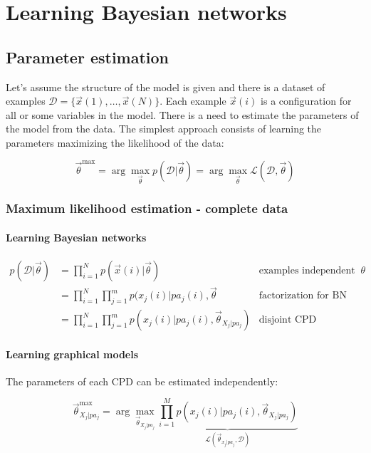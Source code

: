 \chapter{Learning Bayesian networks}

\section{Parameter estimation}
Let's assume the structure of the model is given and there is a dataset of examples $\mathcal{D} =\{\vec{x}(1), \dots, \vec{x}(N)\}$.
Each example $\vec{x}(i)$ is a configuration for all or some variables in the model.
There is a need to estimate the parameters of the model from the data.
The simplest approach consists of learning the parameters maximizing the likelihood of the data:

$$\vec{\theta}^{\max} = \arg\max\limits_{\vec{\theta}}p(\mathcal{D}|\vec{\theta})=\arg\max\limits_{\vec{\theta}}\mathcal{L}(\mathcal{D}, \vec{\theta})$$

	\subsection{Maximum likelihood estimation - complete data}

		\subsubsection{Learning Bayesian networks}

		\begin{align*}
			p(\mathcal{D}|\vec{\theta}) &=\prod\limits_{i=1}^Np(\vec{x}(i)|\vec{\theta})&\text{examples independent given }\theta\\
																	&=\prod\limits_{i=1}^N\prod\limits_{j=1}^mp(x_j(i)|pa_j(i),\vec{\theta} &\text{factorization for BN}\\
																	&=\prod\limits_{i=1}^N\prod\limits_{j=1}^mp(x_j(i)|pa_j(i),\vec{\theta}_{X_j|pa_j}) &\text{disjoint CPD parameters}
		\end{align*}

		\subsubsection{Learning graphical models}
		The parameters of each CPD can be estimated independently:

		$$\vec{\theta}^{\max}_{X_j|pa_j} = \arg\max\limits_{\vec{\theta}_{X_j|pa_j}}\underbrace{\prod\limits_{i=1}^Mp(x_j(i)|pa_j(i),\vec{\theta}_{X_j|pa_j})}_{\mathcal{L}(\vec{\theta}_{x_j|pa_j},\mathcal{D})}$$

